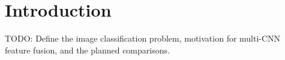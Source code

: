\section{Introduction}

TODO: Define the image classification problem, motivation for multi-CNN feature fusion, and the planned comparisons.
